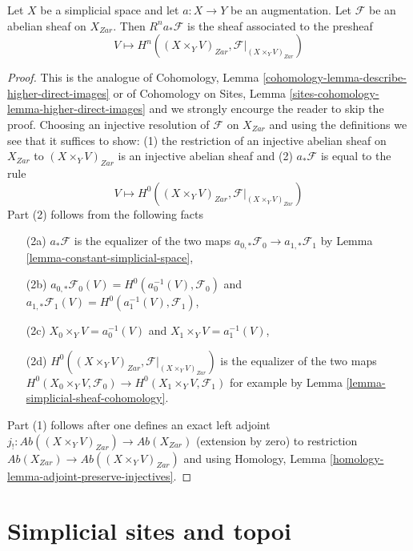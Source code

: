 \begin{lemma}
\label{lemma-augmentation-pushforward-higher-direct-image}
Let $X$ be a simplicial space and let $a : X \to Y$
be an augmentation. Let $\mathcal{F}$ be an abelian sheaf
on $X_{Zar}$. Then $R^na_*\mathcal{F}$ is the sheaf associated
to the presheaf
$$
V \longmapsto H^n((X \times_Y V)_{Zar}, \mathcal{F}|_{(X \times_Y V)_{Zar}})
$$
\end{lemma}

\begin{proof}
This is the analogue of
Cohomology, Lemma \ref{cohomology-lemma-describe-higher-direct-images} or of
Cohomology on Sites, Lemma \ref{sites-cohomology-lemma-higher-direct-images}
and we strongly encourge the reader to skip the proof.
Choosing an injective resolution of $\mathcal{F}$ on
$X_{Zar}$ and using the definitions we see that it suffices to show:
(1) the restriction of an injective abelian
sheaf on $X_{Zar}$ to $(X \times_Y V)_{Zar}$ is an injective abelian sheaf and
(2) $a_*\mathcal{F}$ is equal to the rule
$$
V \longmapsto H^0((X \times_Y V)_{Zar}, \mathcal{F}|_{(X \times_Y V)_{Zar}})
$$
Part (2) follows from the following facts
\begin{enumerate}
\item[(2a)] $a_*\mathcal{F}$ is the equalizer of the two maps
$a_{0, *}\mathcal{F}_0 \to a_{1, *}\mathcal{F}_1$
by Lemma \ref{lemma-constant-simplicial-space},
\item[(2b)] $a_{0, *}\mathcal{F}_0(V) =
H^0(a_0^{-1}(V), \mathcal{F}_0)$ and
$a_{1, *}\mathcal{F}_1(V) = H^0(a_1^{-1}(V), \mathcal{F}_1)$,
\item[(2c)] $X_0 \times_Y V = a_0^{-1}(V)$ and $X_1 \times_Y V = a_1^{-1}(V)$,
\item[(2d)] $H^0((X \times_Y V)_{Zar}, \mathcal{F}|_{(X \times_Y V)_{Zar}})$
is the equalizer of the two maps
$H^0(X_0 \times_Y V, \mathcal{F}_0) \to H^0(X_1 \times_Y V, \mathcal{F}_1)$
for example by Lemma \ref{lemma-simplicial-sheaf-cohomology}.
\end{enumerate}
Part (1) follows after one defines an exact left adjoint
$j_! : \textit{Ab}((X \times_Y V)_{Zar}) \to \textit{Ab}(X_{Zar})$
(extension by zero) to restriction
$\textit{Ab}(X_{Zar}) \to \textit{Ab}((X \times_Y V)_{Zar})$
and using Homology, Lemma \ref{homology-lemma-adjoint-preserve-injectives}.
\end{proof}








\section{Simplicial sites and topoi}
\label{section-simplicial-sites}


